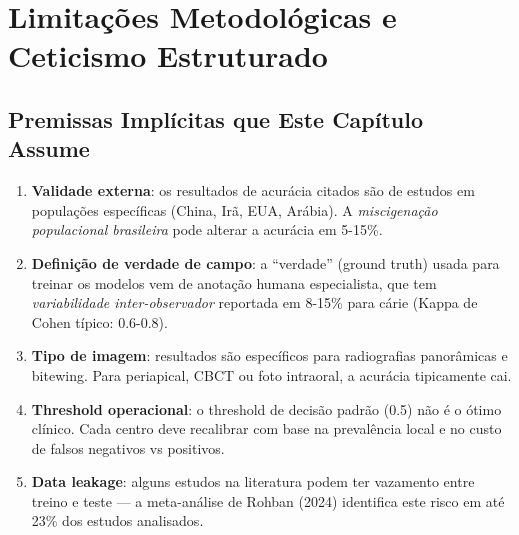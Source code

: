 

\section{Limitações Metodológicas e Ceticismo Estruturado}


\subsection*{Premissas Implícitas que Este Capítulo Assume}

\begin{enumerate}
    \item \textbf{Validade externa}: os resultados de acurácia
    citados são de estudos em populações específicas
    (China, Irã, EUA, Arábia). A \emph{miscigenação populacional brasileira}
    pode alterar a acurácia em 5-15\%.
    \item \textbf{Definição de verdade de campo}: a ``verdade''
    (ground truth) usada para treinar os modelos vem de anotação humana
    especialista, que tem \emph{variabilidade inter-observador}
    reportada em 8-15\% para cárie (Kappa de Cohen típico: 0.6-0.8).
    \item \textbf{Tipo de imagem}: resultados são específicos para
    radiografias panorâmicas e bitewing. Para periapical, CBCT ou
    foto intraoral, a acurácia tipicamente cai.
    \item \textbf{Threshold operacional}: o threshold de decisão
    padrão (0.5) não é o ótimo clínico. Cada centro deve recalibrar
    com base na prevalência local e no custo de falsos negativos vs
    positivos.
    \item \textbf{Data leakage}: alguns estudos na literatura
    podem ter vazamento entre treino e teste --- a meta-análise
    de Rohban (2024) \cite{rohban2024} identifica este risco em
    até 23\% dos estudos analisados.
\end{enumerate}

